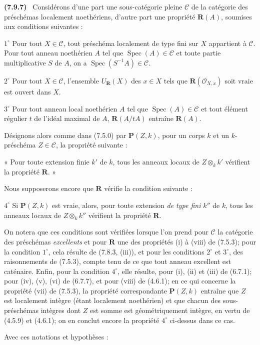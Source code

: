 \documentclass[10pt,oneside]{book}
\newcommand{\oldpage}[2][]{%
  \setcounter{footnote}{0}%
  \marginpar{\scriptsize\textbf{#1}~|~#2}\ignorespaces}
\newenvironment{env}[1][]{\par\medskip\noindent\textbf{(#1)}\ }{\par}
\begin{document}
\begin{env}[7.9.7]
\label{IV.2.s7.9.7-fr}
Considérons d'une part une sous-catégorie pleine $\mathcal C$ de la catégorie
des préschémas localement noethériens, d'autre part une propriété
$\boldsymbol R(A)$, soumises aux conditions suivantes :

$1^\circ$ Pour tout $X\in\mathcal C$, tout préschéma localement de type fini
sur $X$ appartient à $\mathcal C$. Pour tout anneau noethérien $A$ tel que
$\operatorname{Spec}(A)\in\mathcal C$ et toute partie multiplicative $S$ de
$A$, on a $\operatorname{Spec}(S^{-1}A)\in\mathcal C$.

$2^\circ$ Pour tout $X\in\mathcal C$, l'ensemble
$U_{\boldsymbol R}(X)$ des $x\in X$ tels que
$\boldsymbol R(\mathcal O_{X,x})$ soit vraie est ouvert dans $X$.

$3^\circ$ Pour tout anneau local noethérien $A$ tel que
$\operatorname{Spec}(A)\in\mathcal C$ et tout élément régulier $t$ de l'idéal
maximal de $A$, $\boldsymbol R(A/tA)$ entraîne $\boldsymbol R(A)$.

Désignons alors comme dans (7.5.0) par $\boldsymbol P(Z,k)$, pour un corps $k$
et un $k$-préschéma $Z\in\mathcal C$, la propriété suivante :

« Pour toute extension finie $k'$ de $k$, tous les anneaux locaux de
$Z\otimes_k k'$ vérifient la propriété $\boldsymbol R$. »

\oldpage[IV-2]{221}

Nous supposerons encore que $\boldsymbol R$ vérifie la condition suivante :

$4^\circ$ Si $\boldsymbol P(Z,k)$ est vraie, alors, pour toute extension
\emph{de type fini} $k''$ de $k$, tous les anneaux locaux de
$Z\otimes_k k''$ vérifient la propriété $\boldsymbol R$.

On notera que ces conditions sont vérifiées lorsque l'on prend pour
$\mathcal C$ la catégorie des préschémas \emph{excellents} et pour
$\boldsymbol R$ une des propriétés (i) à (viii) de (7.5.3); pour la condition
$1^\circ$, cela résulte de (7.8.3, (iii)), et pour les conditions $2^\circ$ et
$3^\circ$, des raisonnements de (7.5.3), compte tenu de ce que tout anneau
excellent est caténaire. Enfin, pour la condition $4^\circ$, elle résulte,
pour (i), (ii) et (iii) de (6.7.1); pour (iv), (v), (vi) de (6.7.7), et pour
(viii) de (4.6.1); en ce qui concerne la propriété (vii) de (7.5.3), la
propriété correspondante $\boldsymbol P(Z,k)$ entraîne que $Z$ est localement
intègre (étant localement noethérien) et que chacun des sous-préschémas
intègres dont $Z$ est somme est géométriquement intègre, en vertu de (4.5.9)
et (4.6.1); on en conclut encore la propriété $4^\circ$ ci-dessus dans ce cas.

Avec ces notations et hypothèses :
\end{env}
\end{document}
